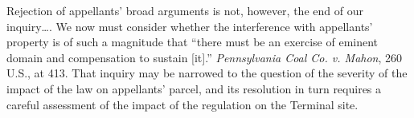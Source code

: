 


Rejection of appellants' broad arguments is not, however, the end of our
inquiry\ldots.
We now must consider whether the interference with appellants' property is of
such a magnitude that ``there must be an exercise of eminent domain and
compensation to sustain [it].'' \textit{Pennsylvania Coal Co. v. Mahon}, 260
U.S., at 413. That inquiry may be narrowed to the question of the severity of
the impact of the law on appellants' parcel, and its resolution in turn requires
a careful assessment of the impact of the regulation on the Terminal site.

